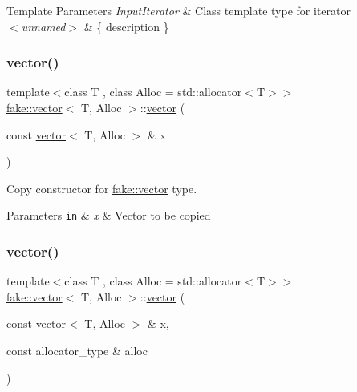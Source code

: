 \begin{DoxyTemplParams}{Template Parameters}
{\em Input\+Iterator} & Class template type for iterator \\
\hline
{\em $<$unnamed$>$} & \{ description \} \\
\hline
\end{DoxyTemplParams}
\mbox{\label{classfake_1_1vector_a706c0c31eae10462a2e16f1cdfd8e665}} 
\subsubsection{\texorpdfstring{vector()}{vector()}\hspace{0.1cm}{\footnotesize\ttfamily [5/9]}}
{\footnotesize\ttfamily template$<$class T , class Alloc  = std\+::allocator$<$\+T$>$$>$ \\
\mbox{\hyperlink{classfake_1_1vector}{fake\+::vector}}$<$ T, Alloc $>$\+::\mbox{\hyperlink{classfake_1_1vector}{vector}} (\begin{DoxyParamCaption}\item[{const \mbox{\hyperlink{classfake_1_1vector}{vector}}$<$ T, Alloc $>$ \&}]{x }\end{DoxyParamCaption})\hspace{0.3cm}{\ttfamily [inline]}}



Copy constructor for \mbox{\hyperlink{classfake_1_1vector}{fake\+::vector}} type. 


\begin{DoxyParams}[1]{Parameters}
\mbox{\tt in}  & {\em x} & Vector to be copied \\
\hline
\end{DoxyParams}
\mbox{\label{classfake_1_1vector_a4d84ce09550fabd1fce9335f9de714c6}} 
\subsubsection{\texorpdfstring{vector()}{vector()}\hspace{0.1cm}{\footnotesize\ttfamily [6/9]}}
{\footnotesize\ttfamily template$<$class T , class Alloc  = std\+::allocator$<$\+T$>$$>$ \\
\mbox{\hyperlink{classfake_1_1vector}{fake\+::vector}}$<$ T, Alloc $>$\+::\mbox{\hyperlink{classfake_1_1vector}{vector}} (\begin{DoxyParamCaption}\item[{const \mbox{\hyperlink{classfake_1_1vector}{vector}}$<$ T, Alloc $>$ \&}]{x,  }\item[{const allocator\+\_\+type \&}]{alloc }\end{DoxyParamCaption})\hspace{0.3cm}{\ttfamily [inline]}}



